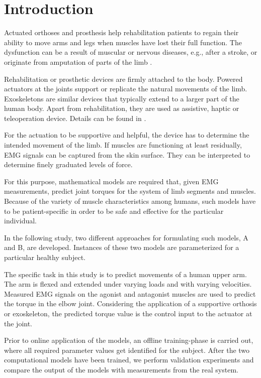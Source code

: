 \section{Introduction}
Actuated orthoses and prosthesis help rehabilitation patients to regain their ability to move arms and legs when muscles have lost their full function. The dysfunction can be a result of muscular or nervous diseases, e.g., after a stroke, or originate from amputation of parts of the limb \cite{Krebs2002, Zhang2018}.

Rehabilitation or prosthetic devices are firmly attached to the body. Powered actuators at the joints support or replicate the natural movements of the limb.
Exoskeletons are similar devices that typically extend to a larger part of the human body. Apart from rehabilitation, they are used as assistive, haptic or teleoperation device. Details can be found in \cite{Perry2007}.

For the actuation to be supportive and helpful, the device has to determine the intended movement of the limb. If muscles are functioning at least residually, EMG signals can be captured from the skin surface. They can be interpreted to determine finely graduated levels of force.

For this purpose, mathematical models are required that, given EMG measurements, predict joint torques for the system of limb segments and muscles. 
Because of the variety of muscle characteristics among humans, such models have to be patient-specific in order to be safe and effective for the particular individual.

In the following study, two different approaches for formulating such models, A and B, are developed. Instances of these two models are parameterized for a particular healthy subject. 

The specific task in this study is to predict movements of a human upper arm. The arm is flexed and extended under varying loads and with varying velocities. Measured EMG signals on the agonist and antagonist muscles are used to predict the torque in the elbow joint. Considering the application of a supportive orthosis or exoskeleton, the predicted torque value is the control input to the actuator at the joint.

Prior to online application of the models, an offline training-phase is carried out, where all required parameter values get identified for the subject. After the two computational models have been trained, we perform validation experiments and compare the output of the models with measurements from the real system.
 
